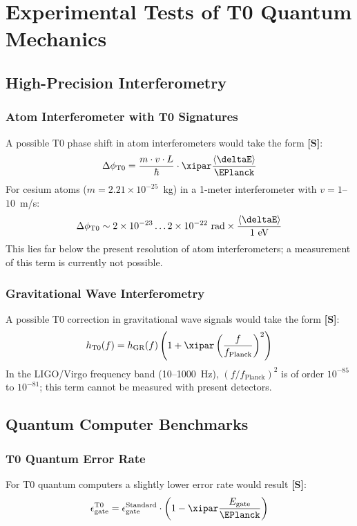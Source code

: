 	\section{Experimental Tests of T0 Quantum Mechanics}
	\subsection{High-Precision Interferometry}
	\subsubsection{Atom Interferometer with T0 Signatures}
	A possible T0 phase shift in atom interferometers would take the form \textbf{[S]}:
	\begin{equation}
		\Delta\phi_{\text{T0}} = \frac{m \cdot v \cdot L}{\hbar} \cdot \xipar \frac{\langle\deltaE\rangle}{\EPlanck}
	\end{equation}
	For cesium atoms ($m = 2.21 \times 10^{-25}$~kg) in a 1-meter interferometer with $v = 1$--$10$~m/s:
	\begin{equation}
		\Delta\phi_{\text{T0}} \sim 2 \times 10^{-23} \ldots 2 \times 10^{-22} \text{ rad} \times \frac{\langle\deltaE\rangle}{1 \text{ eV}}
	\end{equation}
	This lies far below the present resolution of atom interferometers; a measurement of this term is currently not possible.
	\subsubsection{Gravitational Wave Interferometry}
	A possible T0 correction in gravitational wave signals would take the form \textbf{[S]}:
	\begin{equation}
		h_{\text{T0}}(f) = h_{\text{GR}}(f) \left(1 + \xipar \left(\frac{f}{f_{\text{Planck}}}\right)^2\right)
	\end{equation}
	In the LIGO/Virgo frequency band (10--1000~Hz), $(f/f_{\text{Planck}})^2$ is of order $10^{-85}$ to $10^{-81}$; this term cannot be measured with present detectors.
	\subsection{Quantum Computer Benchmarks}
	\subsubsection{T0 Quantum Error Rate}
	For T0 quantum computers a slightly lower error rate would result \textbf{[S]}:
	\begin{equation}
		\epsilon_{\text{gate}}^{\text{T0}} = \epsilon_{\text{gate}}^{\text{Standard}} \cdot \left(1 - \xipar \frac{E_{\text{gate}}}{\EPlanck}\right)
	\end{equation}
